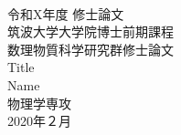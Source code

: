 ~
\begin{center}
	\vspace{10mm}
	{\large 令和X年度 修士論文}\\
	\vspace{10mm}
	{\Large 筑波大学大学院博士前期課程}\\
	\vspace{5mm}
	{\Large 数理物質科学研究群修士論文}\\
	\vspace{30mm}
	{\huge Title}\\
	\vspace{100mm}
	{\Large Name}\\
	\vspace{5mm}
	{\Large 物理学専攻}\\
	\vspace{10mm}
	{\large 2020年２月}\\
	
\end{center}